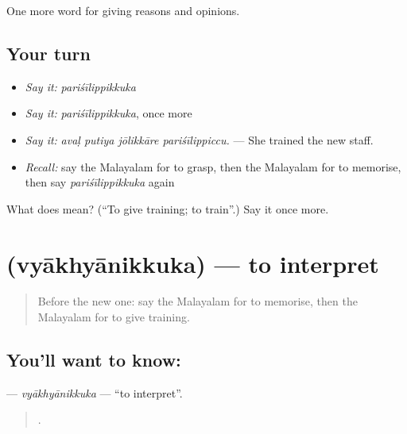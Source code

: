 \begin{grammarlens}[title={What you've built}]
One more word for giving reasons and opinions.
\end{grammarlens}

\subsection*{Your turn}
\begin{itemize}
\raggedright
  \item \emph{Say it:} \emph{pariśīlippikkuka}
  \item \emph{Say it:} \emph{pariśīlippikkuka}, once more
  \item \emph{Say it:} \emph{avaḷ putiya jōlikkāre pariśīlippiccu.} — She trained the new staff.
  \item \emph{Recall:} say the Malayalam for to grasp, then the Malayalam for to memorise, then say \emph{pariśīlippikkuka} again
\end{itemize}

\begin{tcolorbox}[breakable,colback=teal!4,colframe=teal!35!black,title={Before you move on}]
What does  mean? (\textquotedblleft{}To give training; to train\textquotedblright{}.) Say it once more.
\end{tcolorbox}
\section[\texorpdfstring{\ml{വ്യാഖ്യാനിക്കുക} (vyākhyānikkuka)}{വ്യാഖ്യാനിക്കുക (vyākhyānikkuka)}]{ (vyākhyānikkuka) — to interpret}

\label{lesson:ML-C438-vyakhyanikkuka}



\begin{quote}
Before the new one: say the Malayalam for to memorise, then the Malayalam for to give training.
\end{quote}

\subsection*{You'll want to know: }
\textbf{} — \emph{vyākhyānikkuka} — \textquotedblleft{}to interpret\textquotedblright{}.

\begin{quote}
     .
\end{quote}


